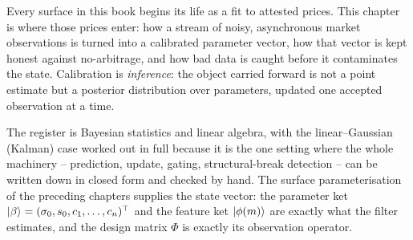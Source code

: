 \documentclass[11pt]{book}
\theoremstyle{plain}
\theoremstyle{definition}
\theoremstyle{remark}
\newcommand{\ket}[1]{\mathinner{\lvert #1 \rangle}}
\newcommand{\featket}{\ket{\phi(\mln)}}          %
\newcommand{\parket}{\ket{\beta}}                %
\newcommand{\mln}{m}                             %
\begin{document}
Every surface in this book begins its life as a fit to attested prices. This
chapter is where those prices enter: how a stream of noisy, asynchronous market
observations is turned into a calibrated parameter vector, how that vector is
kept honest against no-arbitrage, and how bad data is caught before it
contaminates the state. Calibration is \emph{inference}: the object
carried forward is not a point estimate but a posterior distribution over
parameters, updated one accepted observation at a time.

The register is Bayesian statistics and linear algebra, with the linear--Gaussian
(Kalman) case worked out in full because it is the one setting where the whole
machinery -- prediction, update, gating, structural-break detection -- can be
written down in closed form and checked by hand. The surface parameterisation of
the preceding chapters supplies the state vector: the parameter ket
$\parket=(\sigma_0,s_0,c_1,\dots,c_n)^{\top}$ and the feature ket $\featket$ are
exactly what the filter estimates, and the design matrix $\Phi$ is exactly its
observation operator.
\end{document}
